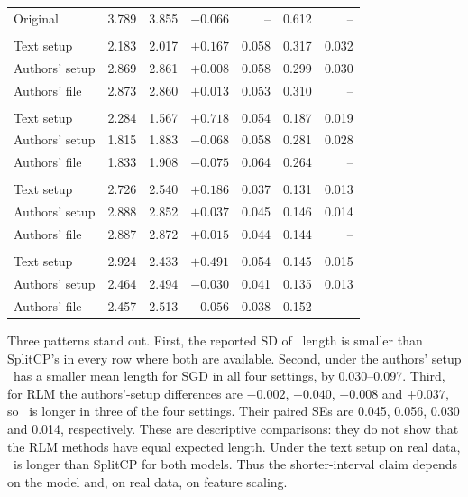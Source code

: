 \begin{table}[htbp]
\begin{tabular}{@{}lrrrrrr@{}}
\quad Original & 3.789 & 3.855 & $-0.066$ & -- & 0.612 & -- \\
\addlinespace
\multicolumn{7}{@{}l}{\emph{Boston, RLM}} \\
\quad Text setup & 2.183 & 2.017 & $+0.167$ & 0.058 & 0.317 & 0.032 \\
\quad Authors' setup & 2.869 & 2.861 & $+0.008$ & 0.058 & 0.299 & 0.030 \\
\quad Authors' file & 2.873 & 2.860 & $+0.013$ & 0.053 & 0.310 & -- \\
\addlinespace
\multicolumn{7}{@{}l}{\emph{Boston, SGD}} \\
\quad Text setup & 2.284 & 1.567 & $+0.718$ & 0.054 & 0.187 & 0.019 \\
\quad Authors' setup & 1.815 & 1.883 & $-0.068$ & 0.058 & 0.281 & 0.028 \\
\quad Authors' file & 1.833 & 1.908 & $-0.075$ & 0.064 & 0.264 & -- \\
\addlinespace
\multicolumn{7}{@{}l}{\emph{Diabetes, RLM}} \\
\quad Text setup & 2.726 & 2.540 & $+0.186$ & 0.037 & 0.131 & 0.013 \\
\quad Authors' setup & 2.888 & 2.852 & $+0.037$ & 0.045 & 0.146 & 0.014 \\
\quad Authors' file & 2.887 & 2.872 & $+0.015$ & 0.044 & 0.144 & -- \\
\addlinespace
\multicolumn{7}{@{}l}{\emph{Diabetes, SGD}} \\
\quad Text setup & 2.924 & 2.433 & $+0.491$ & 0.054 & 0.145 & 0.015 \\
\quad Authors' setup & 2.464 & 2.494 & $-0.030$ & 0.041 & 0.135 & 0.013 \\
\quad Authors' file & 2.457 & 2.513 & $-0.056$ & 0.038 & 0.152 & -- \\
\bottomrule
\end{tabular}
\end{table}

Three patterns stand out. First, the reported SD of \LOO\ length is smaller than SplitCP's in every row where both are available. Second, under the authors' setup \LOO\ has a smaller mean length for SGD in all four settings, by 0.030--0.097. Third, for RLM the authors'-setup differences are $-0.002$, $+0.040$, $+0.008$ and $+0.037$, so \LOO\ is longer in three of the four settings. Their paired SEs are 0.045, 0.056, 0.030 and 0.014, respectively. These are descriptive comparisons: they do not show that the RLM methods have equal expected length. Under the text setup on real data, \LOO\ is longer than SplitCP for both models. Thus the shorter-interval claim depends on the model and, on real data, on feature scaling.

